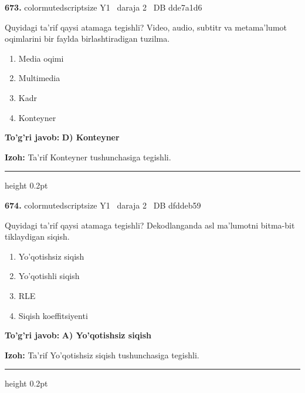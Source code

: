 \documentclass[10pt,a4paper,oneside]{article}
\begin{document}
\noindent\textbf{\color{ink}673.}  {color{muted}scriptsize Y1 \textbullet\ daraja 2 \textbullet\ DB dde7a1d6}
\par
Quyidagi ta'rif qaysi atamaga tegishli? Video, audio, subtitr va metama'lumot oqimlarini bir faylda birlashtiradigan tuzilma.
\begin{enumerate}[label=\Alph*),leftmargin=9mm]
\item Media oqimi
\item Multimedia
\item Kadr
\item Konteyner
\end{enumerate}
\begin{tcolorbox}[enhanced,breakable,colback=teal!4,colframe=teal!50!black,boxrule=0.5pt,arc=1.1mm,left=3mm,right=3mm,top=1.7mm,bottom=1.7mm,before skip=2mm,after skip=2mm]
\textbf{\color{teal}To'g'ri javob:} \textbf{D) Konteyner}
\par\smallskip
\textbf{Izoh:} Ta'rif Konteyner tushunchasiga tegishli.
\end{tcolorbox}
\vspace{2mm}\hrule height 0.2pt \vspace{3mm}

\noindent\textbf{\color{ink}674.}  {color{muted}scriptsize Y1 \textbullet\ daraja 2 \textbullet\ DB dfddeb59}
\par
Quyidagi ta'rif qaysi atamaga tegishli? Dekodlanganda asl ma'lumotni bitma-bit tiklaydigan siqish.
\begin{enumerate}[label=\Alph*),leftmargin=9mm]
\item Yo'qotishsiz siqish
\item Yo'qotishli siqish
\item RLE
\item Siqish koeffitsiyenti
\end{enumerate}
\begin{tcolorbox}[enhanced,breakable,colback=teal!4,colframe=teal!50!black,boxrule=0.5pt,arc=1.1mm,left=3mm,right=3mm,top=1.7mm,bottom=1.7mm,before skip=2mm,after skip=2mm]
\textbf{\color{teal}To'g'ri javob:} \textbf{A) Yo'qotishsiz siqish}
\par\smallskip
\textbf{Izoh:} Ta'rif Yo'qotishsiz siqish tushunchasiga tegishli.
\end{tcolorbox}
\vspace{2mm}\hrule height 0.2pt \vspace{3mm}
\end{document}
